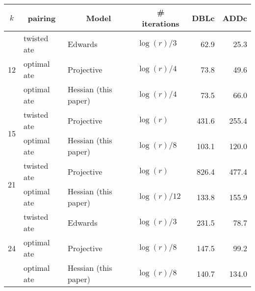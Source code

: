\begin{table}[h]
\begin{tabular}{|l| l| l| l| r| r|}
\hline
\multicolumn{1}{|c|}{$k$}
&\multicolumn{1}{|c|}{pairing} 
&\multicolumn{1}{|c|}{Model}
&\multicolumn{1}{|c|}{\# iterations}
&\multicolumn{1}{|c|}{DBLc}	
&\multicolumn{1}{|c|}{ADDc}	
\\
\hline
\multirow{3}{*}{12} & twisted ate & Edwards~\cite{2014/LWZ} & $\log(r)/3$ & 62.9 & 25.3 \\
 & optimal ate & Projective~\cite{2009/craig} & $\log(r)/4$ & 73.8 & 49.6 \\
 & optimal ate & Hessian (this paper) & $\log(r)/4$ & 73.5 & 66.0 \\
\hline
\multirow{2}{*}{15} & twisted ate & Projective~\cite{2009/craig} & $\log(r)$ & 431.6 & 255.4 \\
 & optimal ate & Hessian (this paper) & $\log(r)/8$ & 103.1 & 120.0 \\
\hline
\multirow{2}{*}{21} & twisted ate & Projective~\cite{2009/craig} & $\log(r)$ & 826.4 & 477.4 \\
 & optimal ate & Hessian (this paper) & $\log(r)/12$ & 133.8 & 155.9 \\
\hline
\multirow{3}{*}{24} & twisted ate & Edwards~\cite{2014/LWZ} & $\log(r)/3$ & 231.5 & 78.7 \\
 & optimal ate & Projective~\cite{2009/craig} & $\log(r)/8$ & 147.5 & 99.2 \\
 & optimal ate & Hessian (this paper) & $\log(r)/8$ & 140.7 & 134.0 \\ \hline
\end{tabular}
\label{tbl-cmp1}
\end{table}

